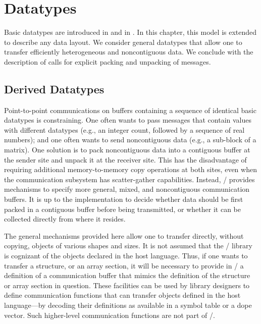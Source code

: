 \chapter{Datatypes}
\label{chap:datatypes}

\def\mword#1{\textrm{\itshape{#1}}} %
\def\msword#1{\textrm{\itshape{\scriptsize #1}}} %
\def\mscode#1{\mpicode{\scriptsize #1}} %
Basic datatypes are introduced
in 
and
in .
In this chapter, this model is
extended
to describe any data layout.
We consider general
datatypes that allow one to transfer efficiently
heterogeneous and noncontiguous data.
We conclude with the description of calls for explicit packing and unpacking of
messages.

\section{Derived Datatypes}
\label{sec:pt2pt-datatype}

Point-to-point communications on buffers containing a sequence of identical basic datatypes
is constraining.  One often wants to pass
messages that contain values with different datatypes (e.g., an integer count,
followed by a sequence of real numbers); and one often wants to send
noncontiguous data (e.g., a sub-block of a matrix).  One solution is to
pack noncontiguous data into a contiguous buffer
at the sender site and unpack it
at the receiver site.   This has
the disadvantage of requiring additional memory-to-memory copy operations
at both sites, even when the communication
subsystem has scatter-gather capabilities.   Instead, \MPI/ provides
mechanisms to specify more general, mixed, and noncontiguous
communication buffers. It is up to the implementation to decide
whether data should be first packed in a contiguous buffer before being
transmitted, or whether it can be collected directly from where it
resides.

The general mechanisms provided here allow one to transfer directly,
without copying, objects of various shapes and sizes.  It is not assumed
that the \MPI/ library is cognizant of the objects declared in the host
language. Thus, if one wants to transfer a structure, or an array
section, it will be necessary to provide in \MPI/ a definition of a
communication buffer that mimics the definition of the structure or
array section in question.  These facilities can be used by library
designers to define communication functions that can transfer objects
defined in the host language---by decoding their definitions as
available in a symbol table or a dope vector.  Such higher-level
communication functions are not part of \MPI/.

